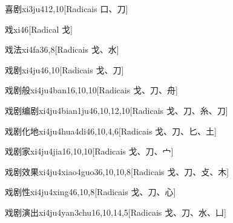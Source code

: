 \begin{entry}{喜剧}{xi3ju4}{12,10}[Radicais ⼝、⼑]
\end{entry}

\begin{entry}{戏}{xi4}{6}[Radical ⼽]
\end{entry}

\begin{entry}{戏法}{xi4fa3}{6,8}[Radicais ⼽、⽔]
\end{entry}

\begin{entry}{戏剧}{xi4ju4}{6,10}[Radicais ⼽、⼑]
\end{entry}

\begin{entry}{戏剧般}{xi4ju4ban1}{6,10,10}[Radicais ⼽、⼑、⾈]
\end{entry}

\begin{entry}{戏剧编剧}{xi4ju4bian1ju4}{6,10,12,10}[Radicais ⼽、⼑、⽷、⼑]
\end{entry}

\begin{entry}{戏剧化地}{xi4ju4hua4di4}{6,10,4,6}[Radicais ⼽、⼑、⼔、⼟]
\end{entry}

\begin{entry}{戏剧家}{xi4ju4jia1}{6,10,10}[Radicais ⼽、⼑、⼧]
\end{entry}

\begin{entry}{戏剧效果}{xi4ju4xiao4guo3}{6,10,10,8}[Radicais ⼽、⼑、⽁、⽊]
\end{entry}

\begin{entry}{戏剧性}{xi4ju4xing4}{6,10,8}[Radicais ⼽、⼑、⼼]
\end{entry}

\begin{entry}{戏剧演出}{xi4ju4yan3chu1}{6,10,14,5}[Radicais ⼽、⼑、⽔、⼐]
\end{entry}

